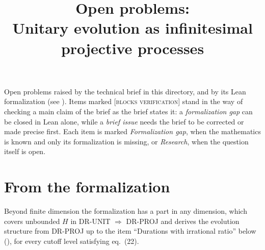 \documentclass[11pt]{article}
\title{Open problems:\\ Unitary evolution as infinitesimal projective processes}
\author{}
\date{}
\begin{document}
\maketitle

\noindent
Open problems raised by the technical brief in this directory, and by its Lean formalization
(see ).
Items marked \textsc{[blocks verification]} stand in the way of checking a main
claim of the brief as the brief states it: a \emph{formalization gap} can be closed
in Lean alone, while a \emph{brief issue} needs the brief to be corrected or made
precise first.
Each item is marked \emph{Formalization gap}, when the mathematics is known and only its
formalization is missing, or \emph{Research}, when the question itself is open.

\section*{From the formalization}
\noindent Beyond finite dimension the formalization has a part in any dimension, which covers
unbounded $H$ in DR-UNIT $\Rightarrow$ DR-PROJ and derives the evolution structure
 from DR-PROJ up to the item ``Durations with irrational ratio'' below
(), for every cutoff level satisfying
eq.~(22).
\end{document}
